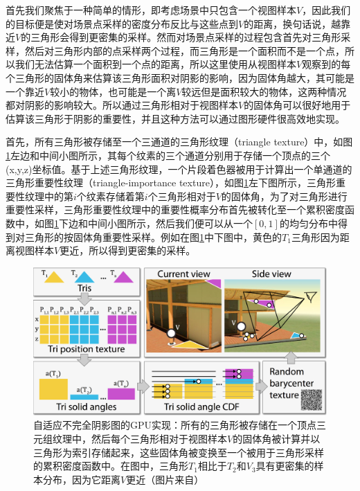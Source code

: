 首先我们聚焦于一种简单的情形，即考虑场景中只包含一个视图样本$V$，因此我们的目标便是使对场景点采样的密度分布反比与这些点到$V$的距离，换句话说，越靠近$V$的三角形会得到更密集的采样。然而对场景点采样的过程包含首先对三角形采样，然后对三角形内部的点采样两个过程，而三角形是一个面积而不是一个点，所以我们无法估算一个面积到一个点的距离，所以这里使用从视图样本$V$观察到的每个三角形的固体角来估算该三角形面积对阴影的影响，因为固体角越大，其可能是一个靠近$V$较小的物体，也可能是一个离$V$较远但是面积较大的物体，这两种情况都对阴影的影响较大。所以通过三角形相对于视图样本$V$的固体角可以很好地用于估算该三角形于阴影的重要性，并且这种方法可以通过图形硬件很高效地实现。

首先，所有三角形被存储至一个三通道的三角形纹理（triangle texture）中，如图\ref{f:adaptive-ISMs}左边和中间小图所示，其每个纹素的三个通道分别用于存储一个顶点的三个(x,y,z)坐标值。基于上述三角形纹理，一个片段着色器被用于计算出一个单通道的三角形重要性纹理（triangle-importance texture），如图\ref{f:adaptive-ISMs}左下图所示，三角形重要性纹理中的第$i$个纹素存储着第$i$个三角形相对于$V$的固体角，为了对三角形进行重要性采样，三角形重要性纹理中的重要性概率分布首先被转化至一个累积密度函数中，如图\ref{f:adaptive-ISMs}下边和中间小图所示，然后我们便可以从一个$[0,1]$的均匀分布中得到对三角形的按固体角重要性采样。例如在图\ref{f:adaptive-ISMs}中下图中，黄色的$T_1$三角形因为距离视图样本$V$更近，所以得到更密集的采样。

\begin{figure}
	\includegraphics[width=1.\textwidth]{figures/ir/ir-5-4}
	\caption{自适应不完全阴影图的GPU实现：所有的三角形被存储在一个顶点三元组纹理中，然后每个三角形相对于视图样本$V$的固体角被计算并以三角形为索引存储起来，这些固体角被变换至一个被用于三角形采样的累积密度函数中。在图中，三角形$T_1$相比于$T_2$和$V_3$具有更密集的样本分布，因为它距离$V$更近（图片来自\cite{a:MakingImperfectShadowMapsViewAdaptive}）}
	\label{f:adaptive-ISMs}
\end{figure}

